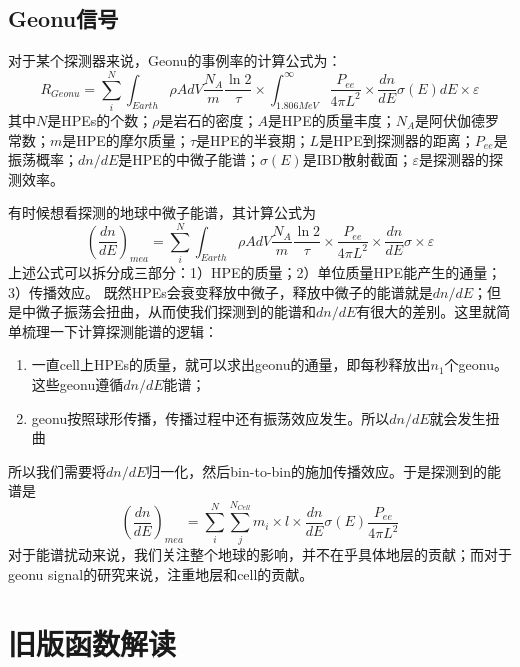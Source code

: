 	\section{Geonu信号}
		\begin{GCBox}[title = Geonu信号的计算]{}
			对于某个探测器来说，Geonu的事例率的计算公式为：
				\begin{equation}
					R_{Geonu}
					= \sum_i^N \int_{Earth}\rho A dV \frac{N_A}{m}\frac{\ln 2}{\tau} \times  \int_{1.806MeV}^\infty \frac{P_{ee}}{4\pi L^2}\times \frac{dn}{dE}\sigma(E)dE \times \varepsilon
				\end{equation}
			其中$N$是HPEs的个数；$\rho$是岩石的密度；$A$是HPE的质量丰度；$N_A$是阿伏伽德罗常数；$m$是HPE的摩尔质量；$\tau$是HPE的半衰期；$L$是HPE到探测器的距离；$P_{ee}$是振荡概率；$dn/dE$是HPE的中微子能谱；$\sigma(E)$是IBD散射截面；$\varepsilon$是探测器的探测效率。\par
			有时候想看探测的地球中微子能谱，其计算公式为
				\begin{equation}
					\left(\frac{dn}{dE}\right)_{mea}
					= \sum_i^N \int_{Earth} \rho A dV \frac{N_A}{m} \frac{\ln 2}{\tau}
					\times \frac{P_{ee}}{4\pi L^2}
					\times \frac{dn}{dE}\sigma \times \varepsilon
				\end{equation}
			上述公式可以拆分成三部分：1）HPE的质量；2）单位质量HPE能产生的通量；3）传播效应。
		\tcbline
			既然HPEs会衰变释放中微子，释放中微子的能谱就是$dn/dE$；但是中微子振荡会扭曲，从而使我们探测到的能谱和$dn/dE$有很大的差别。这里就简单梳理一下计算探测能谱的逻辑：
				\begin{enumerate}
					\item 一直cell上HPEs的质量，就可以求出geonu的通量，即每秒释放出$n_1$个geonu。这些geonu遵循$dn/dE$能谱；
					\item geonu按照球形传播，传播过程中还有振荡效应发生。所以$dn/dE$就会发生扭曲
				\end{enumerate}
			所以我们需要将$dn/dE$归一化，然后bin-to-bin的施加传播效应。于是探测到的能谱是
				\begin{equation}
					\left(\frac{dn}{dE}\right)_{mea}
					= \sum_i^N \sum_j^{N_{Cell}}m_i \times l \times \frac{dn}{dE}\sigma(E)\frac{P_{ee}}{4\pi L^2}
				\end{equation}
			对于能谱扰动来说，我们关注整个地球的影响，并不在乎具体地层的贡献；而对于geonu signal的研究来说，注重地层和cell的贡献。
		\end{GCBox}
\chapter{旧版函数解读}

